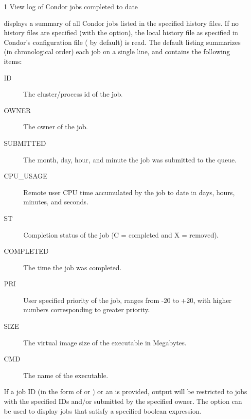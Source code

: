 \begin{ManPage}{\label{man-condor-history}}{1}
{View log of Condor jobs completed to date}
\Synopsis
{}


\Description
{} displays a summary of all Condor jobs listed in the
specified history files.
If no history files are specified (with the  option), the local
history file as specified in Condor's configuration file
( by default) is read.  
The default listing
summarizes (in chronological order)
each job on a single line, and  contains the following items:


\begin{description}
\item[ID] The cluster/process id of the job. 
\item[OWNER] The owner of the job. 
\item[SUBMITTED] The month, day, hour, and minute the job was submitted to the queue. 
\item[CPU\_USAGE] Remote user CPU time accumulated by the job to date in days, hours, minutes, and seconds.
\item[ST] Completion status of the job (C = completed and X = removed).
\item[COMPLETED] The time the job was completed.
\item[PRI] User specified priority of the job, ranges from -20 to +20, with higher numbers corresponding to greater priority. 
\item[SIZE] The virtual image size of the executable in Megabytes. 
\item[CMD] The name of the executable. 
\end{description}

If a job ID (in the form of  or ) or an
 is provided, output will be restricted to jobs with the
specified IDs and/or submitted by the specified owner.  
The  option can be used to display jobs that satisfy a
specified boolean expression.


\end{ManPage}

